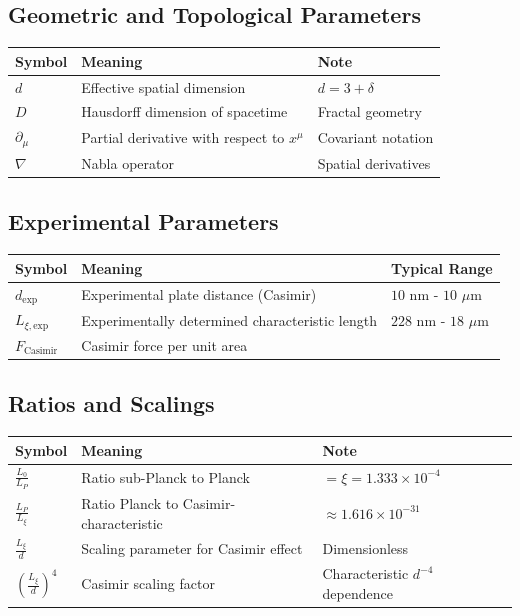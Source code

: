 	\subsection{Geometric and Topological Parameters}
	\begin{longtable}{>{\raggedright\arraybackslash}p{1.5cm} >{\raggedright\arraybackslash}p{6.5cm} >{\raggedright\arraybackslash}p{2.5cm}}
		\toprule
		\textbf{Symbol} & \textbf{Meaning} & \textbf{Note} \\
		\midrule
		$d$ & Effective spatial dimension & $d = 3 + \delta$ \\
		$D$ & Hausdorff dimension of spacetime & Fractal geometry \\
		$\partial_\mu$ & Partial derivative with respect to $x^\mu$ & Covariant notation \\
		$\nabla$ & Nabla operator & Spatial derivatives \\
		\bottomrule
	\end{longtable}
	
	\subsection{Experimental Parameters}
	\begin{longtable}{>{\raggedright\arraybackslash}p{1.5cm} >{\raggedright\arraybackslash}p{6.5cm} >{\raggedright\arraybackslash}p{2.5cm}}
		\toprule
		\textbf{Symbol} & \textbf{Meaning} & \textbf{Typical Range} \\
		\midrule
		$d_{\text{exp}}$ & Experimental plate distance (Casimir) & $10$ nm - $10$ $\mu$m \\
		$L_{\xi,\text{exp}}$ & Experimentally determined characteristic length & $228$ nm - $18$ $\mu$m \\
		$F_{\text{Casimir}}$ & Casimir force per unit area & [N/m$^2$] \\
		\bottomrule
	\end{longtable}
	
	\subsection{Ratios and Scalings}
	\begin{longtable}{>{\raggedright\arraybackslash}p{1.5cm} >{\raggedright\arraybackslash}p{6.5cm} >{\raggedright\arraybackslash}p{2.5cm}}
		\toprule
		\textbf{Symbol} & \textbf{Meaning} & \textbf{Note} \\
		\midrule
		$\frac{L_0}{L_P}$ & Ratio sub-Planck to Planck & $= \xi = 1.333 \times 10^{-4}$ \\
		$\frac{L_P}{L_\xi}$ & Ratio Planck to Casimir-characteristic & $\approx 1.616 \times 10^{-31}$ \\
		$\frac{L_\xi}{d}$ & Scaling parameter for Casimir effect & Dimensionless \\
		$\left(\frac{L_\xi}{d}\right)^4$ & Casimir scaling factor & Characteristic $d^{-4}$ dependence \\
		\bottomrule
	\end{longtable}
	
